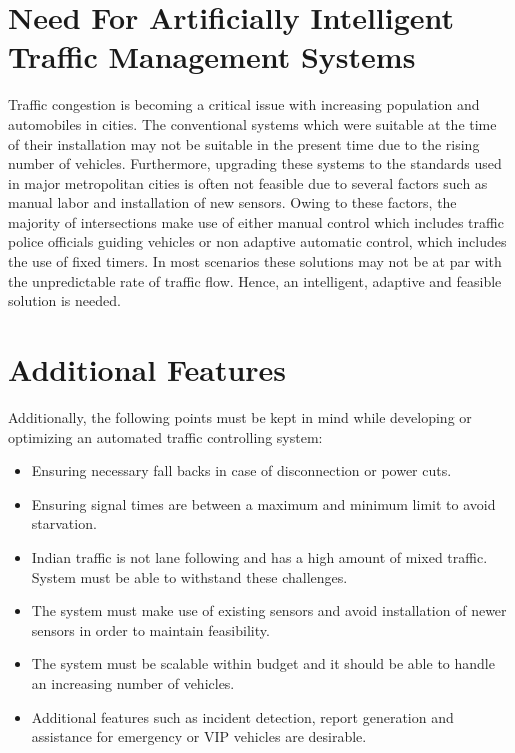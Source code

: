 \documentclass[openany,12pt]{report}
\begin{document}
	\section{Need For Artificially Intelligent Traffic Management Systems}
	\hspace*{0.5in}Traffic congestion is becoming a critical issue with increasing population and automobiles in cities. The conventional systems which were suitable at the time of their installation may not be suitable in the present time due to the rising number of vehicles. Furthermore, upgrading these systems to the standards used in major metropolitan cities is often not feasible due to several factors such as manual labor and installation of new sensors. Owing to these factors, the majority of intersections make use of either manual control which includes traffic police officials guiding vehicles or non adaptive automatic control, which includes the use of fixed timers. In most scenarios these solutions may not be at par with the unpredictable rate of traffic flow. Hence, an intelligent, adaptive and feasible solution is needed.\\
	
	\section{Additional Features}
	\hspace*{0.5in}Additionally, the following points must be kept in mind while developing or optimizing an automated traffic controlling system:\\
	
	\begin{itemize}
		\item{Ensuring necessary fall backs in case of disconnection or power cuts.}
		\item{Ensuring signal times are between a maximum and minimum limit to avoid starvation.}
		\item{Indian traffic is not lane following and has a high amount of mixed traffic. System must be able to withstand these challenges.}
		\item{The system must make use of existing sensors and avoid installation of newer sensors in order to maintain feasibility.}
		\item{The system must be scalable within budget and it should be able to handle an increasing number of vehicles.}
		\item{Additional features such as incident detection, report generation and assistance for emergency or VIP vehicles are desirable.}
	\end{itemize}
	
\end{document}
